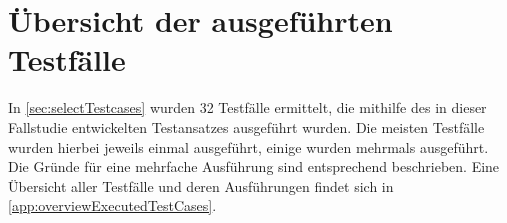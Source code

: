 \section{Übersicht der ausgeführten Testfälle}
\label{sec:overviewExecTestCases}

In \autoref{sec:selectTestcases} wurden 32 Testfälle ermittelt, die mithilfe des in dieser Fallstudie entwickelten Testansatzes ausgeführt wurden.
Die meisten Testfälle wurden hierbei jeweils einmal ausgeführt, einige wurden mehrmals ausgeführt.
Die Gründe für eine mehrfache Ausführung sind entsprechend beschrieben.
Eine Übersicht aller Testfälle und deren Ausführungen findet sich in \autoref{app:overviewExecutedTestCases}.


